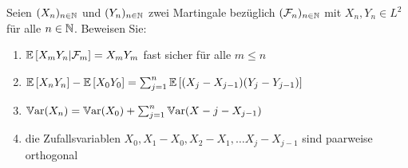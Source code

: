 \begin{exercisePage}
	\undef\xy
	
	\begin{task}
		Seien $(X_n)_{n \in \mathbb{N}}$ und $(Y_n)_{n \in \mathbb{N}}$ zwei Martingale bezüglich $(\mathcal{F}_n)_{n \in \mathbb{N}}$ mit $X_n, Y_n \in L^2$ für alle $n \in \mathbb{N}$. Beweisen Sie:
		\begin{enumerate}[label=(\alph*)]
			\item $\mathbb{E} \left[ X_m Y_n | \mathcal{F}_m \right] = X_m Y_m$ fast sicher für alle $m \le n$
			\item $\mathbb{E} \left[ X_n Y_n \right] - \mathbb{E} \left[ X_0 Y_0 \right] = \sum_{j=1}^n \mathbb{E} \left[ (X_j - X_{j-1})(Y_j - Y_{j-1}) \right]$
			\item $\operatorname{\mathbb Var}(X_n) = \operatorname{\mathbb Var}(X_0) + \sum_{j=1}^n \operatorname{\mathbb Var}(X-j - X_{j-1})$
			\item die Zufallsvariablen $X_0, X_1 - X_0, X_2 - X_1, \dots X_j - X_{j-1}$ sind paarweise orthogonal
		\end{enumerate}
	\end{task}
	

\end{exercisePage}
